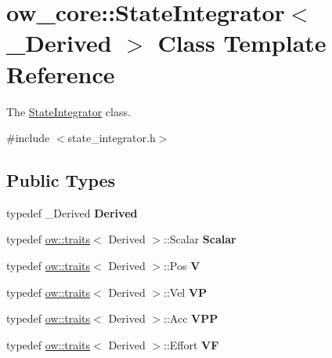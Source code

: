 \hypertarget{classow__core_1_1StateIntegrator}{}\section{ow\+\_\+core\+:\+:State\+Integrator$<$ \+\_\+\+Derived $>$ Class Template Reference}
\label{classow__core_1_1StateIntegrator}


The \hyperlink{classow__core_1_1StateIntegrator}{State\+Integrator} class.  




{\ttfamily \#include $<$state\+\_\+integrator.\+h$>$}

\subsection*{Public Types}
\begin{DoxyCompactItemize}
\item 
typedef \+\_\+\+Derived {\bfseries Derived}\hypertarget{classow__core_1_1StateIntegrator_af987389b49ff71360dd15d08a6022814}{}\label{classow__core_1_1StateIntegrator_af987389b49ff71360dd15d08a6022814}

\item 
typedef \hyperlink{structow_1_1traits}{ow\+::traits}$<$ Derived $>$\+::Scalar {\bfseries Scalar}\hypertarget{classow__core_1_1StateIntegrator_af706796fa6baaae4cad301437e0912c1}{}\label{classow__core_1_1StateIntegrator_af706796fa6baaae4cad301437e0912c1}

\item 
typedef \hyperlink{structow_1_1traits}{ow\+::traits}$<$ Derived $>$\+::Pos {\bfseries V}\hypertarget{classow__core_1_1StateIntegrator_a6859def6f343bbd87ad09e3585592c2b}{}\label{classow__core_1_1StateIntegrator_a6859def6f343bbd87ad09e3585592c2b}

\item 
typedef \hyperlink{structow_1_1traits}{ow\+::traits}$<$ Derived $>$\+::Vel {\bfseries VP}\hypertarget{classow__core_1_1StateIntegrator_a99735a3be0f915e791101a4920957057}{}\label{classow__core_1_1StateIntegrator_a99735a3be0f915e791101a4920957057}

\item 
typedef \hyperlink{structow_1_1traits}{ow\+::traits}$<$ Derived $>$\+::Acc {\bfseries V\+PP}\hypertarget{classow__core_1_1StateIntegrator_aa4f9ef405b5795554061eb9e6332dd14}{}\label{classow__core_1_1StateIntegrator_aa4f9ef405b5795554061eb9e6332dd14}

\item 
typedef \hyperlink{structow_1_1traits}{ow\+::traits}$<$ Derived $>$\+::Effort {\bfseries VF}\hypertarget{classow__core_1_1StateIntegrator_a2953a5e35d5e22d461918dd77acb1c57}{}\label{classow__core_1_1StateIntegrator_a2953a5e35d5e22d461918dd77acb1c57}

\end{DoxyCompactItemize}
